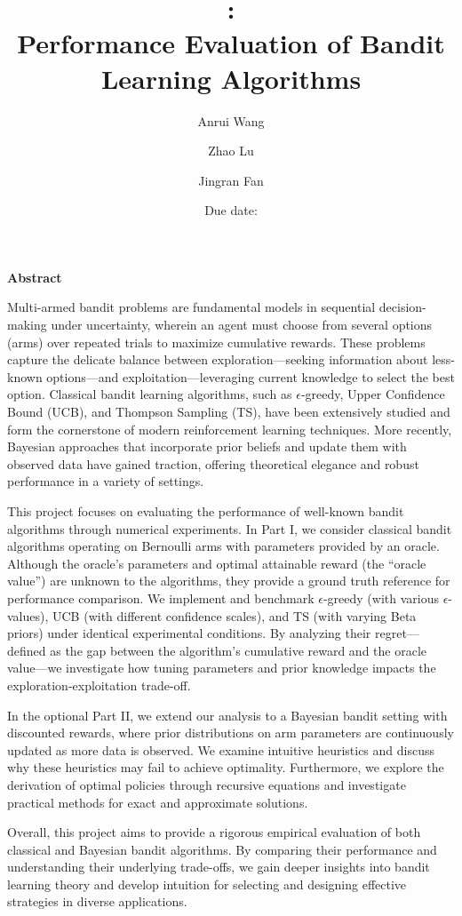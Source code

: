 \documentclass[11pt]{article}
\title{
    \vspace{100pt}
    \bigskip
    \textbf{\CourseName:} \\
    \textbf{Performance Evaluation of Bandit Learning Algorithms} \\
    \bigskip
}
\author{Anrui Wang \and Zhao Lu \and Jingran Fan}
\date{Due date: \DueDate}
\renewenvironment{abstract}
  {\begin{center}\bfseries\Large Abstract\vspace{1em}\end{center}%
   \normalsize} %
  {}
\begin{document}
\setlength{\parindent}{2em}

\maketitle

\newpage

\begin{abstract}

Multi-armed bandit problems are fundamental models in sequential decision-making under uncertainty, wherein an agent must choose from several options (arms) over repeated trials to maximize cumulative rewards. These problems capture the delicate balance between exploration—seeking information about less-known options—and exploitation—leveraging current knowledge to select the best option. Classical bandit learning algorithms, such as 
$\epsilon$-greedy, Upper Confidence Bound (UCB), and Thompson Sampling (TS), have been extensively studied and form the cornerstone of modern reinforcement learning techniques. More recently, Bayesian approaches that incorporate prior beliefs and update them with observed data have gained traction, offering theoretical elegance and robust performance in a variety of settings.

This project focuses on evaluating the performance of well-known bandit algorithms through numerical experiments. In Part I, we consider classical bandit algorithms operating on Bernoulli arms with parameters provided by an oracle. Although the oracle’s parameters and optimal attainable reward (the “oracle value”) are unknown to the algorithms, they provide a ground truth reference for performance comparison. We implement and benchmark 
$\epsilon$-greedy (with various $\epsilon$-values), UCB (with different confidence scales), and TS (with varying Beta priors) under identical experimental conditions. By analyzing their regret—defined as the gap between the algorithm’s cumulative reward and the oracle value—we investigate how tuning parameters and prior knowledge impacts the exploration-exploitation trade-off.

In the optional Part II, we extend our analysis to a Bayesian bandit setting with discounted rewards, where prior distributions on arm parameters are continuously updated as more data is observed. We examine intuitive heuristics and discuss why these heuristics may fail to achieve optimality. Furthermore, we explore the derivation of optimal policies through recursive equations and investigate practical methods for exact and approximate solutions.

Overall, this project aims to provide a rigorous empirical evaluation of both classical and Bayesian bandit algorithms. By comparing their performance and understanding their underlying trade-offs, we gain deeper insights into bandit learning theory and develop intuition for selecting and designing effective strategies in diverse applications.
\end{abstract}
\end{document}
